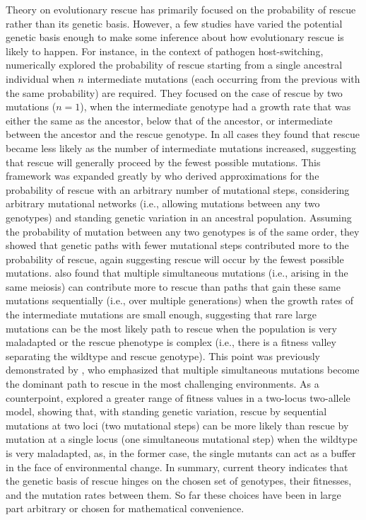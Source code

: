\documentclass[9pt,twocolumn,twoside,lineno]{gsajnl}
\begin{document}
Theory on evolutionary rescue \citep[reviewed in][]{Alexander2014} has primarily focused on the probability of rescue rather than its genetic basis.
However, a few studies have varied the potential genetic basis enough to make some inference about how evolutionary rescue is likely to happen.
For instance, in the context of pathogen host-switching, \cite{Antia2003} numerically explored the probability of rescue starting from a single ancestral individual when $n$ intermediate mutations (each occurring from the previous with the same probability) are required.
They focused on the case of rescue by two mutations ($n=1$), when the intermediate genotype had a growth rate that was either the same as the ancestor, below that of the ancestor, or intermediate between the ancestor and the rescue genotype. 
In all cases they found that rescue became less likely as the number of intermediate mutations increased, suggesting that rescue will generally proceed by the fewest possible mutations.
This framework was expanded greatly by \cite{Iwasa2004} who derived approximations for the probability of rescue with an arbitrary number of mutational steps, considering arbitrary mutational networks (i.e., allowing mutations between any two genotypes) and standing genetic variation in an ancestral population.
Assuming the probability of mutation between any two genotypes is of the same order, they showed that genetic paths with fewer mutational steps contributed more to the probability of rescue, again suggesting rescue will occur by the fewest possible mutations.
\cite{Iwasa2004} also found that multiple simultaneous mutations (i.e., arising in the same meiosis) can contribute more to rescue than paths that gain these same mutations sequentially (i.e., over multiple generations) when the growth rates of the intermediate mutations are small enough, suggesting that rare large mutations can be the most likely path to rescue when the population is very maladapted or the rescue phenotype is complex (i.e., there is a fitness valley separating the wildtype and rescue genotype).    
This point was previously demonstrated by \cite{Alexander2010}, who emphasized that multiple simultaneous mutations become the dominant path to rescue in the most challenging environments. 
As a counterpoint, \cite{Uecker2016} explored a greater range of fitness values in a two-locus two-allele model, showing that, with standing genetic variation, rescue by sequential mutations at two loci (two mutational steps) can be more likely than rescue by mutation at a single locus (one simultaneous mutational step) when the wildtype is very maladapted, as, in the former case, the single mutants can act as a buffer in the face of environmental change. 
In summary, current theory indicates that the genetic basis of rescue hinges on the chosen set of genotypes, their fitnesses, and the mutation rates between them. 
So far these choices have been in large part arbitrary or chosen for mathematical convenience.   
\end{document}

